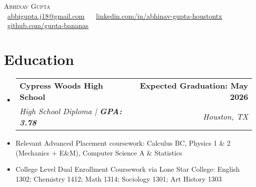 \documentclass[letterpaper,11pt]{article}
\makeatletter
\newcommand{\resumeItem}[1]{
  \item\small{
    {#1 \vspace{0pt}}
  }
}
\newcommand{\resumeSubheading}[4]{
  \vspace{-2pt}\item
    \begin{tabular*}{1.0\textwidth}[t]{l@{\extracolsep{\fill}}r}
      \textbf{#1} & \textbf{\small #2} \\
      \textit{\small#3} & \textit{\small #4} \\
    \end{tabular*}\vspace{-7pt}
}
\newcommand{\resumeSubHeadingListStart}{\begin{itemize}[leftmargin=0.0in, label={}]}
\newcommand{\resumeSubHeadingListEnd}{\end{itemize}}\vspace{0pt}
\newcommand{\resumeItemListStart}{\begin{itemize}}
\newcommand{\resumeItemListEnd}{\end{itemize}\vspace{-5pt}}
\makeatother
\begin{document}
\begin{center}
        {\Large \scshape Abhinav Gupta} \\[2mm]
    \footnotesize \raisebox{-0.1\height}
    {\faEnvelope\  \underline{abbigupta.j18@gmail.com} ~}
    {\faLinkedin\ \underline{\href{www.linkedin.com/in/abhinav-gupta-houstontx}{linkedin.com/in/abhinav-gupta-houstontx}} }
    {\faGithub\ \underline{\href{www.github.com/gupta-bananas}{github.com/gupta-bananas}} ~}
    \vspace{-8pt}
\end{center}

\section{Education} 
  \resumeSubHeadingListStart
    \resumeSubheading
      {Cypress Woods High School}{Expected Graduation: May 2026}
      {High School Diploma  |\textbf{ GPA: 3.78}  
      }{Houston, TX}
  \resumeSubHeadingListEnd
    \resumeItemListStart
        \resumeItem {Relevant Advanced Placement coursework: Calculus BC, Physics 1 \& 2 (Mechanics + E\&M), Computer Science A \& Statistics}
        \vspace{-5pt}
        \resumeItem {College Level Dual Enrollment Coursework via Lone Star College: English 1302; Chemistry 1412; Math 1314; Sociology 1301; Art History 1303}
    \resumeItemListEnd
    \vspace{-10pt}
\end{document}
